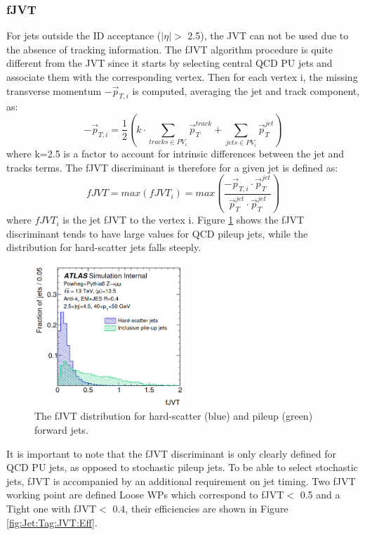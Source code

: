 \subsubsection{fJVT}
\label{Jet:Tag:JVT:fJVT}
For jets outside the ID acceptance ($|\eta|>$ 2.5), the JVT can not be used due to the absence of tracking information. The fJVT algorithm procedure is quite different from the JVT since it starts by selecting central QCD PU jets and associate them with the corresponding vertex. Then for each vertex i, the missing transverse momentum $-\vec{p}_{T, i}$ is computed, averaging the jet and track component, as:
\begin{equation}
    -\vec{p}_{T, i}=\frac{1}{2}\left(k \cdot \sum_{tracks \in P V_{i}} \vec{p}_{T}^{track }+\sum_{jets \in PV_{i}} \vec{p}_{T}^{jet}\right)
\end{equation}
where k=2.5 is a factor to account for intrinsic differences between the jet and tracks terms. The fJVT discriminant is therefore for a given jet is defined as:
\begin{equation}
    fJVT = max(fJVT_i) = max(\frac{-\vec{p}_{T, i} \cdot \vec{p}_{T}^{j e t}}{\vec{p}_{T}^{j e t} \cdot \vec{p}_{T}^{j e t}})
\end{equation}
where $fJVT_i$ is the jet fJVT to the vertex i. Figure \ref{fig:Jet:Tag:JVT:fJVT} shows the fJVT discriminant tends to have large values for QCD pileup jets, while the distribution for hard-scatter jets falls steeply.
\begin{figure}[htbp]
    \centering
    \includegraphics[width=0.5\textwidth]{Ch4/Img/fJVT.png}
    \caption{The fJVT distribution for hard-scatter (blue) and pileup (green) forward jets.}
    \label{fig:Jet:Tag:JVT:fJVT}
\end{figure}
It is important to note that the fJVT discriminant is only clearly defined for QCD PU jets, as opposed to stochastic pileup jets. To be able to select stochastic jets, fJVT is accompanied by an additional requirement on jet timing. Two fJVT working point are defined Loose WPs which correspond to fJVT$<$ 0.5 and a Tight one with fJVT$<$ 0.4, their efficiencies are shown in Figure \ref{fig:Jet:Tag:JVT:Eff}.
